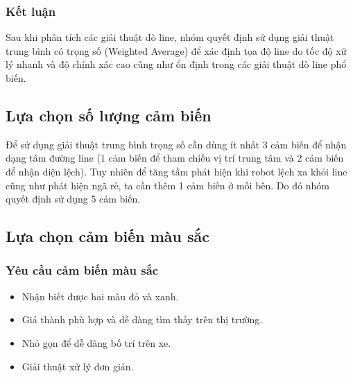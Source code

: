             \subsubsection{Kết luận}
                \hspace*{0.6cm}Sau khi phân tích các giải thuật dò line, nhóm quyết định sử dụng giải thuật trung bình có trọng số (Weighted Average) để xác định tọa độ line do tốc độ xử lý nhanh và độ chính xác cao cũng như ổn định trong các giải thuật dò line phổ biến.
        \subsection{Lựa chọn số lượng cảm biến}
            \hspace*{0.6cm}Để sử dụng giải thuật trung bình trọng số cần dùng ít nhất 3 cảm biến để nhận dạng tâm đường line (1 cảm biến để tham chiếu vị trí trung tâm và 2 cảm biến để nhận diện lệch). Tuy nhiên để tăng tầm phát hiện khi robot lệch xa khỏi line cũng như phát hiện ngã rẻ, ta cần thêm 1 cảm biến ở mỗi bên. Do đó nhóm quyết định sử dụng 5 cảm biến. 
    \subsection{Lựa chọn cảm biến màu sắc}
        \subsubsection{Yêu cầu cảm biến màu sắc}
            \begin{itemize}
                \item Nhận biết được hai màu đỏ và xanh.
                \item Giá thành phù hợp và dễ dàng tìm thấy trên thị trường. 
                \item Nhỏ gọn để dễ dàng bố trí trên xe. 
                \item Giải thuật xử lý đơn giản.
            \end{itemize}
